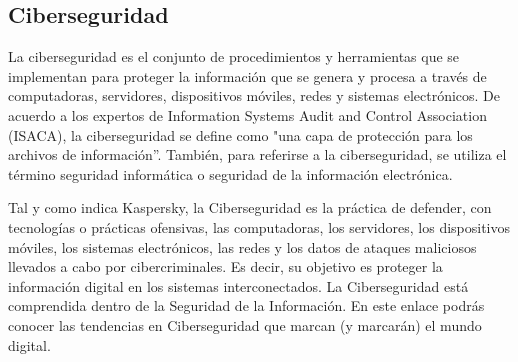 \documentclass[12pt]{article}
\begin{document}
\subsection*{Ciberseguridad}
La ciberseguridad es el conjunto de procedimientos y herramientas que se implementan para proteger la información que se genera y procesa a través de computadoras, servidores, dispositivos móviles, redes y sistemas electrónicos.
De acuerdo a los expertos de Information Systems Audit and Control Association (ISACA), la ciberseguridad se define como "una capa de protección para los archivos de información”. También, para referirse a la ciberseguridad, se utiliza el término seguridad informática o seguridad de la información electrónica.

Tal y como indica Kaspersky, la Ciberseguridad es la práctica de defender, con tecnologías o prácticas ofensivas, las computadoras, los servidores, los dispositivos móviles, los sistemas electrónicos, las redes y los datos de ataques maliciosos llevados a cabo por cibercriminales.
Es decir, su objetivo es proteger la información digital en los sistemas interconectados. La Ciberseguridad está comprendida dentro de la Seguridad de la Información. En este enlace podrás conocer las tendencias en Ciberseguridad que marcan (y marcarán) el mundo digital. 
\end{document}

